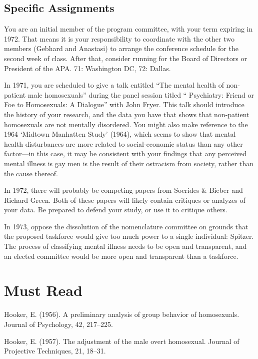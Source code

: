\begin{refsection}
\subsection{Specific Assignments}
\label{specificassignments}

You are an initial member of the program committee, with your term expiring in 1972. That means it is your responsibility to coordinate with the other two members (Gebhard and Anastasi) to arrange the conference schedule for the second week of class. After that, consider running for the Board of Directors or President of the APA. 71: Washington DC, 72: Dallas.

In 1971, you are scheduled to give a talk entitled ``The mental health of non-patient male homosexuals'' during the panel session titled `` Psychiatry: Friend or Foe to Homosexuals: A Dialogue'' with John Fryer. This talk should introduce the history of your research, and the data you have that shows that non-patient homosexuals are not mentally disordered. You might also make reference to the 1964 `Midtown Manhatten Study' (1964), which seems to show that mental health disturbances are more related to social-economic status than any other factor---in this case, it may be consistent with your findings that any perceived mental illness is gay men is the result of their ostracism from society, rather than the cause thereof. 

In 1972, there will probably be competing papers from Socrides \& Bieber and Richard Green. Both of these papers will likely contain critiques or analyzes of your data. Be prepared to defend your study, or use it to critique others.

In 1973, oppose the dissolution of the nomenclature committee on grounds that the proposed taskforce would give too much power to a single individual: Spitzer. The process of classifying mental illness needs to be open and transparent, and an elected committee would be more open and transparent than a taskforce.

\section{Must Read}
\label{mustread}

Hooker, E. (1956). A preliminary analysis of group behavior of homosexuals. Journal of Psychology, 42, 217--225.

Hooker, E. (1957). The adjustment of the male overt homosexual. Journal of Projective Techniques, 21, 18--31.


\end{refsection}
